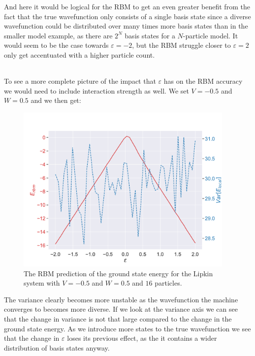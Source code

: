 And here it would be logical for the RBM to get an even greater benefit from the fact that the true wavefunction only consists of a single basis state since a diverse wavefunction could be distributed over many times more basis states than in the smaller model example, as there are $2^N$ basis states for a $N$-particle model. It would seem to be the case towards $\varepsilon = -2$, but the RBM struggle closer to $\varepsilon = 2$ only get accentuated with a higher particle count.

\vspace{\baselineskip}
\\

To see a more complete picture of the impact that $\varepsilon$ has on the RBM accuracy we would need to include interaction strength as well. We set $V=-0.5$ and $W=0.5$ and we then get:

\begin{figure}[H]
  \begin{center}
    \includegraphics[width=0.95\textwidth]{Figures/Plots/Lipkin/[eps][-2.0-2.0][e=850][n=16][V=-0.5][W=0.5].pdf}
  \end{center}
  \caption{The RBM prediction of the ground state energy for the Lipkin system with $V=-0.5$ and $W=0.5$ and $16$ particles.}
\end{figure}

The variance clearly becomes more unstable as the wavefunction the machine converges to becomes more diverse. If we look at the variance axis we can see that the change in variance is not that large compared to the change in the ground state energy. As we introduce more states to the true wavefunction we see that the change in $\varepsilon$ loses its previous effect, as the it contains a wider distribution of basis states anyway.

